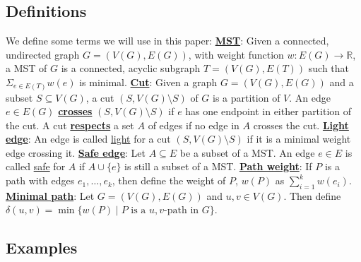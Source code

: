 \documentclass[11pt]{article}
\begin{document}
\subsection{Definitions}

We define some terms we will use in this paper:
\newline
\newline
\textbf{\underline{MST}}: Given a connected, undirected graph $G=(V(G),E(G))$,
with weight function $w:E(G)\rightarrow\mathbb{R}$, a MST of $G$ is a connected,
acyclic subgraph $T=(V(G),E(T))$ such that $\Sigma_{e\in E(T)}w(e)$ is minimal.
\newline
\newline
\textbf{\underline{Cut}}: Given a graph $G=(V(G),E(G))$ and a subset
$S\subseteq V(G)$, a cut $(S,V(G)\setminus S)$ of $G$ is a partition of $V$.
An edge $e\in E(G)$ \textbf{\underline{crosses}} $(S,V(G)\setminus S)$ if $e$
has one endpoint in either partition of the cut. A cut
\textbf{\underline{respects}} a set $A$ of edges if no edge in $A$ crosses the
cut.
\newline
\newline
\textbf{\underline{Light edge}}: An edge is called \underline{light} for a cut
$(S,V(G)\setminus S)$ if it is a minimal weight edge crossing it.
\newline
\newline
\textbf{\underline{Safe edge}}: Let $A\subseteq E$ be a subset of a MST. An
edge $e\in E$ is called \underline{safe} for $A$ if $A\cup\{e\}$ is still a
subset of a MST.
\newline
\newline
\textbf{\underline{Path weight}}: If $P$ is a path with edges $e_1,\ldots,e_k$,
then define the weight of $P$, $w(P)$ as $\sum_{i=1}^kw(e_i)$.
\newline
\newline
\textbf{\underline{Minimal path}}: Let $G=(V(G),E(G))$ and $u,v\in V(G)$. Then
define $\delta(u,v)=\min\{w(P)\mid\text{$P$ is a $u,v$-path in $G$}\}$.


\subsection{Examples}

\begin{figure}[H]

\end{figure}
\begin{figure}[H]

\end{figure}
\begin{figure}[H]

\end{figure}
\end{document}
